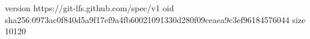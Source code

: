 version https://git-lfs.github.com/spec/v1
oid sha256:0973ac0f840d5a9f17ef9a4fb60021091330d280f09ceaea9c3ef96184576044
size 10120
